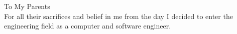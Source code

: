 \begin{dedication}
{\large{To My Parents}}\\[5mm]
For all their sacrifices and belief in me from the day I decided to enter the engineering field as a computer and software engineer.
\end{dedication}

